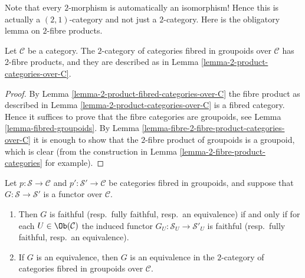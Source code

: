 \noindent
Note that every $2$-morphism is automatically an isomorphism!
Hence this is actually a $(2, 1)$-category and not just a
$2$-category. Here is the obligatory lemma on $2$-fibre products.

\begin{lemma}
\label{lemma-2-product-fibred-categories}
Let $\mathcal{C}$ be a category.
The $2$-category of categories fibred in groupoids
over $\mathcal{C}$ has 2-fibre products, and they are described as in
Lemma \ref{lemma-2-product-categories-over-C}.
\end{lemma}

\begin{proof}
By Lemma \ref{lemma-2-product-fibred-categories-over-C}
the fibre product as described in
Lemma \ref{lemma-2-product-categories-over-C} is a fibred category.
Hence it suffices to prove that the fibre categories are
groupoids, see Lemma \ref{lemma-fibred-groupoids}.
By Lemma \ref{lemma-fibre-2-fibre-product-categories-over-C}
it is enough to show that the $2$-fibre product of groupoids
is a groupoid, which is clear (from the construction in
Lemma \ref{lemma-2-fibre-product-categories} for example).
\end{proof}

\begin{lemma}
\label{lemma-equivalence-fibred-categories}
Let $p : \mathcal{S}\to \mathcal{C}$ and
$p' : \mathcal{S'}\to \mathcal{C}$ be categories fibred in groupoids, and
suppose that $G : \mathcal{S}\to \mathcal {S}'$ is a functor over
$\mathcal{C}$.
\begin{enumerate}
\item Then $G$ is faithful (resp.\ fully faithful, resp.\ an equivalence)
if and only if for each $U\in\Ob(\mathcal{C})$ the induced functor
$G_U : \mathcal{S}_U\to \mathcal{S}'_U$ is faithful
(resp.\ fully faithful, resp.\ an equivalence).
\item If $G$ is an equivalence, then $G$ is an equivalence in the
$2$-category of categories fibred in groupoids over $\mathcal{C}$.
\end{enumerate}
\end{lemma}


